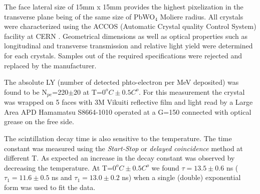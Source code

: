 The face lateral size of 15mm x 15mm  provides the highest pixelization in the transverse plane being  of the same size of  PbWO$_4$  Moliere radius.  All crystals were characterized using the ACCOS (Automatic Crystal quality Control System) facility  at CERN \cite{accos}. Geometrical dimensions as well as optical properties such as longitudinal and transverse  transmission and relative light yield were determined for each crystals. Samples out of the required specifications were rejected and replaced by the manufacturer. 

The absolute LY (number of detected phto-electron per MeV deposited) was found to be N$_{pe}$=220$\pm$20 at T=$0^o C\pm 0.5C^o$. For this measurement  the crystal was wrapped on 5 faces with 3M Vikuiti reflective film and light read by a Large Area APD Hamamatsu S8664-1010 operated at a G=150 connected with optical grease on the free side. 

The scintillation decay time is also sensitive to the temperature. The time constant was measured using the {\it Start-Stop} or {\it delayed coincidence} method at different T. As expected an increase in the decay constant was observed by decreasing the temperature. At T=$0^oC\pm 0.5C^o$ we found $\tau=13.5\pm 0.6$ ns ($\tau_1=11.6\pm 0.5$ ns and $\tau_1=13.0\pm 0.2$ ns) when a single (double) exponential form was used to fit the data.



